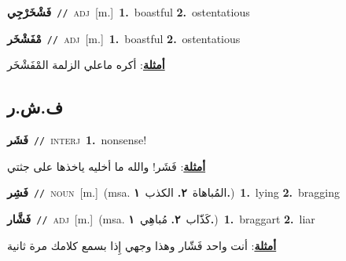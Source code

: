 \documentclass[10pt,a4paper,twoside]{article} %
\begin{document}
\begin{multicols}{2}
{\setlength\topsep{0pt}\textbf{\foreignlanguage{arabic}{فَشْخَرْجِي}}\ {\color{gray}\texttt{//}\color{black}}\ \textsc{adj}\ [m.]\ \textbf{1.}~boastful  \textbf{2.}~ostentatious\ } \vspace{2mm}

{\setlength\topsep{0pt}\textbf{\foreignlanguage{arabic}{مْفَشْخَر}}\ {\color{gray}\texttt{//}\color{black}}\ \textsc{adj}\ [m.]\ \textbf{1.}~boastful  \textbf{2.}~ostentatious\  \begin{flushright}\color{gray}\foreignlanguage{arabic}{\textbf{\underline{\foreignlanguage{arabic}{أمثلة}}}: أكره ماعلي الزلمة المْفَشْخَر}\end{flushright}\color{black}} \vspace{2mm}

\vspace{-3mm}
\subsection*{\color{blue}\foreignlanguage{arabic}{ف.ش.ر}\color{blue}{}} 

{\setlength\topsep{0pt}\textbf{\foreignlanguage{arabic}{فَشَر}}\ {\color{gray}\texttt{//}\color{black}}\ \textsc{interj}\ \textbf{1.}~nonsense!\  \begin{flushright}\color{gray}\foreignlanguage{arabic}{\textbf{\underline{\foreignlanguage{arabic}{أمثلة}}}: فَشَر! والله ما أخليه ياخذها على جثتي}\end{flushright}\color{black}} \vspace{2mm}

{\setlength\topsep{0pt}\textbf{\foreignlanguage{arabic}{فَشِر}}\ {\color{gray}\texttt{//}\color{black}}\ \textsc{noun}\ [m.]\ \color{gray}(msa. \foreignlanguage{arabic}{المُباهاة}~\foreignlanguage{arabic}{\textbf{٢.}}  \foreignlanguage{arabic}{الكذب}~\foreignlanguage{arabic}{\textbf{١.}})\color{black}\ \textbf{1.}~lying  \textbf{2.}~bragging\ } \vspace{2mm}

{\setlength\topsep{0pt}\textbf{\foreignlanguage{arabic}{فَشَّار}}\ {\color{gray}\texttt{//}\color{black}}\ \textsc{adj}\ [m.]\ \color{gray}(msa. \foreignlanguage{arabic}{كَذّاب}~\foreignlanguage{arabic}{\textbf{٢.}}  \foreignlanguage{arabic}{مُباهِي}~\foreignlanguage{arabic}{\textbf{١.}})\color{black}\ \textbf{1.}~braggart  \textbf{2.}~liar\  \begin{flushright}\color{gray}\foreignlanguage{arabic}{\textbf{\underline{\foreignlanguage{arabic}{أمثلة}}}: أنت واحد فَشّار وهذا وجهي إِذا بسمع كلامك مرة ثانية}\end{flushright}\color{black}} \vspace{2mm}


\end{multicols}
\end{document}

